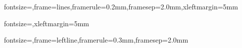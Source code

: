\newcommand{\cinput}[6]{%
    \cinputraw{cstrip/#1}{#2#1}{#3}{}{#4}{#5}{#6}}

\newcommand{\cinputpart}[7]{%
    \cinputraw{cstrip/#1}{#2#1}{#3}{\quad \textbf{part #4}}{#5}{#6}{#7}}

\newcommand{\cinputpartnostrip}[7]{%
    \cinputraw{#1}{#2}{#3}{\quad \textbf{part #4}}{#5}{#6}{#7}}

{fontsize=\small,frame=lines,framerule=0.2mm,framesep=2.0mm,xleftmargin=5mm}

{fontsize=\small,xleftmargin=5mm}

{fontsize=\small,frame=leftline,framerule=0.3mm,framesep=2.0mm}


\newcommand{\complabel}[2]{#1 \\ \footnotesize #2}
\newcommand{\usedlabel}[2]{\complabel{#1}{\emph{#2}}}

